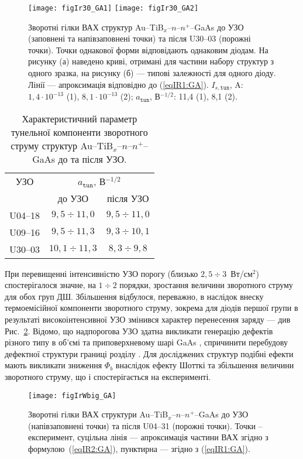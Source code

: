 \begin{figure}
\center
\texttt{[image: figIr30\_GA1]} \hfill
\texttt{[image: figIr30\_GA2]}
\caption{\label{figIr30_GA}
Зворотні гілки ВАХ структур Au--TiB$_x$--$n$--$n^+$--GaAs
до УЗО (заповнені та напівзаповнені точки)
та після U30--03 (порожні точки).
Точки однакової форми відповідають однаковим діодам.
На рисунку (а) наведено криві, отримані для частини набору структур з одного зразка,
на рисунку (б) --- типові залежності для одного діоду.
Лінії --- апроксимація відповідно до (\ref{eqIR1:GA}).
$I_{s,\mathtt{tun}}$, A: $1,4\cdot10^{-13}$ (1), $8,1\cdot10^{-13}$ (2);
$a_\mathtt{tun}$, В$^{-1/2}$: 11,4 (1), 8,1 (2).
}%
\end{figure}

\begin{table}
\caption{\label{tabUS_GaAs}Характеристичний параметр тунельної компоненти
зворотного струму структур Au--TiB$_x$--$n$--$n^+$--GaAs до та після УЗО.
}
\center
\begin{tabular}{|c|c|c|}
\hline
УЗО&\multicolumn{2}{c|}{$a_\mathtt{tun}$, В$^{-1/2}$}\\ \cline{2-3}
& до УЗО & після УЗО \\
\hline
U04--18&$9,5\div11,0$&$9,5\div11,0$\\ \hline
U09--16&$9,5\div11,3$&$9,3\div10,1$\\ \hline
U30--03&$10,1\div11,3$&$8,3\div9,8$\\ \hline
\end{tabular}
\end{table}


При перевищенні інтенсивністю  УЗО порогу (близько $2,5\div3$~Вт/см$^2$) спостерігалося значне, на $1\div2$ порядки,
зростання величини зворотного струму для обох груп ДШ.
Збільшення відбулося, переважно, в наслідок внеску термоемісійної компоненти зворотного струму, зокрема для діодів першої групи в результаті високоінтенсивної УЗО
змінився характер перенесення заряду --- див Рис.~\ref{figIrWbig_GA}.
Відомо, що надпорогова УЗО здатна викликати генерацію дефектів різного типу в об’ємі та приповерхневому шарі GaAs \cite{Zaver},
спричинити перебудову дефектної структури границі розділу \cite{Parchinskii2003r}.
Для досліджених структур подібні ефекти мають викликати зниження $\Phi_b$ внаслідок ефекту Шотткі та збільшення величини зворотного струму, що і спостерігається на експерименті.


\begin{figure}
\center
\texttt{[image: figIrWbig\_GA]}%
\caption{\label{figIrWbig_GA}
Зворотні гілки ВАХ структури Au--TiB$_x$--$n$--$n^+$--GaAs
до УЗО (напівзаповнені точки)
та після U04--31 (порожні точки).
Точки -- експеримент,
суцільна лінія --- апроксимація частини ВАХ згідно з формулою~(\ref{eqIR2:GA}),
пунктирна  --- згідно з (\ref{eqIR1:GA}).
}%
\end{figure}




